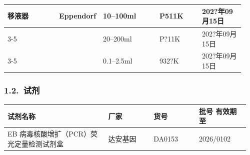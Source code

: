 \documentclass[UTF8,10pt,a4paper,fontset=fandol]{ctexart}
\newcommand{\fieldvalue}[1]{#1}
\newcommand{\handwritten}[1]{#1}
\begin{document}
\begin{tabular}{|p{0.22\linewidth}|p{0.12\linewidth}|p{0.24\linewidth}|p{0.18\linewidth}|p{0.18\linewidth}|}
\fieldvalue{移液器} &
\fieldvalue{Eppendorf} &
\fieldvalue{\handwritten{10--100ml}} &
\fieldvalue{\handwritten{P511K}} &
\fieldvalue{\handwritten{202?年09月15日}}
\\ \cline{3-5}
& &
\fieldvalue{\handwritten{20--200ml}} &
\fieldvalue{\handwritten{P?11K}} &
\fieldvalue{\handwritten{202?年09月15日}}
\\ \cline{3-5}
& &
\fieldvalue{\handwritten{0.1--2.5ml}} &
\fieldvalue{\handwritten{932?K}} &
\fieldvalue{\handwritten{202?年09月15日}}
\\ \hline
\end{tabular}

\subsubsection{1.2.\ 试剂}

\begin{tabular}{|p{0.40\linewidth}|p{0.18\linewidth}|p{0.18\linewidth}|p{0.20\linewidth}|}
\hline
试剂名称 & 厂家 & 货号 & 批号 \quad 有效期至 \\
\hline
\fieldvalue{EB 病毒核酸增扩（PCR）荧光定量检测试剂盒} &
\fieldvalue{达安基因} &
\fieldvalue{DA0153} &
\fieldvalue{\handwritten{2026/0102}}
\\ \hline
\end{tabular}
\end{document}
